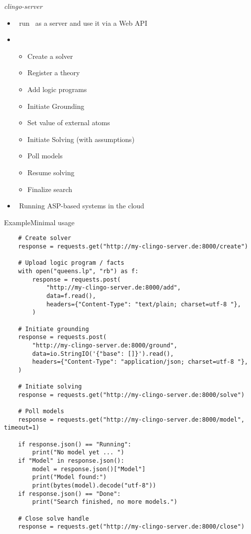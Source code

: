 \begin{frame}{\textit{clingo-server}}
  \begin{itemize}
    \item {} \ run \clingo\ as a server and use it via a Web API
    \item {} \
      \begin{itemize}
        \item Create a solver
        \item Register a theory
        \item Add logic programs
        \item Initiate Grounding
        \item Set value of external atoms
        \item Initiate Solving (with assumptions)
        \item Poll models
        \item Resume solving
        \item Finalize search
      \end{itemize}
    \item {} \ Running ASP-based systems in the cloud
  \end{itemize}
\end{frame}
\begin{frame}[fragile,shrink]{Example}{Minimal usage}
  \begin{lstlisting}
    # Create solver
    response = requests.get("http://my-clingo-server.de:8000/create")

    # Upload logic program / facts
    with open("queens.lp", "rb") as f:
        response = requests.post(
            "http://my-clingo-server.de:8000/add",
            data=f.read(),
            headers={"Content-Type": "text/plain; charset=utf-8 "},
        )

    # Initiate grounding
    response = requests.post(
        "http://my-clingo-server.de:8000/ground",
        data=io.StringIO('{"base": []}').read(),
        headers={"Content-Type": "application/json; charset=utf-8 "},
    )

    # Initiate solving
    response = requests.get("http://my-clingo-server.de:8000/solve")

    # Poll models
    response = requests.get("http://my-clingo-server.de:8000/model", timeout=1)

    if response.json() == "Running":
        print("No model yet ... ")
    if "Model" in response.json():
        model = response.json()["Model"]
        print("Model found:")
        print(bytes(model).decode("utf-8"))
    if response.json() == "Done":
        print("Search finished, no more models.")

    # Close solve handle
    response = requests.get("http://my-clingo-server.de:8000/close")
  \end{lstlisting}
\end{frame}

%
